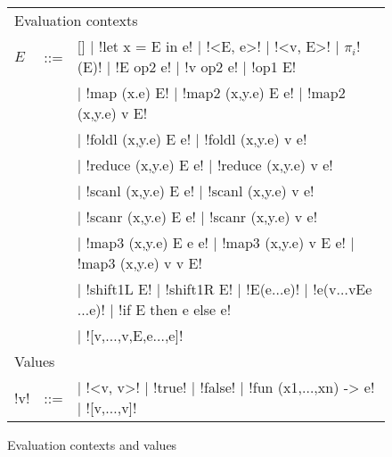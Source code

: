 \begin{figure*}[t]
    \begin{tabular}{|l c l|}
        \hline
        \multicolumn{3}{|l|}{Evaluation contexts} \\
        $E$ & \mbox{::=} & 
        [] 
        $\mid$ !let x = E in e! 
        $\mid$ !<E, e>!
        $\mid$ !<v, E>!
        $\mid$ $\pi_i$!(E)!
        $\mid$ !E op2 e!
        $\mid$ !v op2 e!
        $\mid$ !op1 E! \\
        && $\mid$ !map (x.e) E!
        $\mid$ !map2 (x,y.e) E e!
        $\mid$ !map2 (x,y.e) v E! \\
        && $\mid$ !foldl (x,y.e) E e!
        $\mid$ !foldl (x,y.e) v e! \\
        && $\mid$ !reduce (x,y.e) E e! 
        $\mid$ !reduce (x,y.e) v e! \\
        && $\mid$ !scanl (x,y.e) E e!
        $\mid$ !scanl (x,y.e) v e! \\
        && $\mid$ !scanr (x,y.e) E e!
        $\mid$ !scanr (x,y.e) v e! \\
        && $\mid$ !map3 (x,y.e) E e e!
        $\mid$ !map3 (x,y.e) v E e!
        $\mid$ !map3 (x,y.e) v v E! \\
        && $\mid$ !shift1L E! 
        $\mid$ !shift1R E!
        $\mid$ !E(e$\ldots$e)!
        $\mid$ !e(v$\ldots$vEe$\ldots$e)!
        $\mid$ !if E then e else e! \\
        && $\mid$ ![v,$\ldots$,v,E,e$\ldots$,e]!
        \\ \hline
        \multicolumn{3}{|l|}{Values} \\ 
        !v! & \mbox{::=} & 
        \cnst{}  
        $\mid$ !<v, v>!
        $\mid$ !true! 
        $\mid$ !false!
        $\mid$ !fun (x1,$\ldots$,xn) -> e!
        $\mid$ ![v,$\ldots$,v]! 
        \\ \hline
        \end{tabular}
    \caption{Evaluation contexts and values}
\label{fig:ev_contexts}    
\end{figure*}